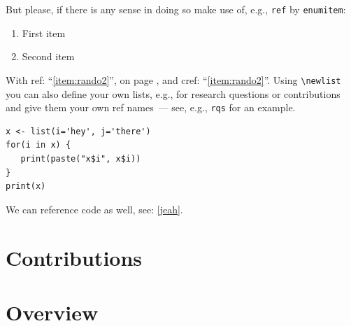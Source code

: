 But please, if there is any sense in doing so make use of, e.g., \texttt{ref} by \texttt{enumitem}:

\begin{enumerate}[ref={Penguin Element \arabic*}]
   \item \label{item:rando2}First item
   \item Second item
\end{enumerate}

With ref: \enquote{\ref{item:rando2}}, on page \pageref{item:rando2}, and cref: \enquote{\cref{item:rando2}}.
Using \texttt{\textbackslash newlist} you can also define your own lists, e.g., for research questions or contributions and give them your own ref names~--- see, e.g., \texttt{rqs} for an example.


\begin{verbatim}
x <- list(i='hey', j='there')
for(i in x) {
   print(paste("x$i", x$i))
}
print(x)
\end{verbatim}

We can reference code as well, see: \cref{jeah}.

\section{Contributions}

\section{Overview}